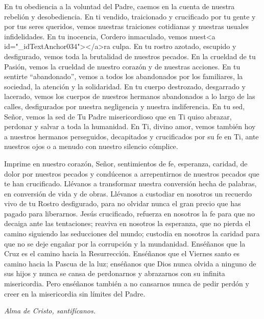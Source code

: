 			\begin{body}En tu obediencia a la voluntad del Padre, caemos en la cuenta de nuestra rebelión y desobediencia. En ti vendido, traicionado y crucificado por tu gente y por tus seres queridos, vemos nuestras traiciones cotidianas y nuestras usuales infidelidades. En tu inocencia, Cordero inmaculado, vemos nuest<a id="_idTextAnchor034"></a>ra culpa. En tu rostro azotado, escupido y desfigurado, vemos toda la brutalidad de nuestros pecados. En la crueldad de tu Pasión, vemos la crueldad de nuestro corazón y de nuestras acciones. En tu sentirte “abandonado”, vemos a todos los abandonados por los familiares, la sociedad, la atención y la solidaridad. En tu cuerpo destrozado, desgarrado y lacerado, vemos los cuerpos de nuestros hermanos abandonados a lo largo de las calles, desfigurados por nuestra negligencia y nuestra indiferencia. En tu sed, Señor, vemos la sed de Tu Padre misericordioso que en Ti quiso abrazar, perdonar y salvar a toda la humanidad. En Ti, divino amor, vemos también hoy a nuestros hermanos perseguidos, decapitados y crucificados por su fe en Ti, ante nuestros ojos o a menudo con nuestro silencio cómplice. \end{body}
			
			\begin{body}Imprime en nuestro corazón, Señor, sentimientos de fe, esperanza, caridad, de dolor por nuestros pecados y condúcenos a arrepentirnos de nuestros pecados que te han crucificado. Llévanos a transformar nuestra conversión hecha de palabras, en conversión de vida y de obras. Llévanos a custodiar en nosotros un recuerdo vivo de tu Rostro desfigurado, para no olvidar nunca el gran precio que has pagado para liberarnos. Jesús crucificado, refuerza en nosotros la fe para que no decaiga ante las tentaciones; reaviva en nosotros la esperanza, que no pierda el camino siguiendo las seducciones del mundo; custodia en nosotros la caridad para que no se deje engañar por la corrupción y la mundanidad. Enséñanos que la Cruz es el camino hacia la Resurrección. Enséñanos que el Viernes santo es camino hacia la Pascua de la luz; enséñanos que Dios nunca olvida a ninguno de sus hijos y nunca se cansa de perdonarnos y abrazarnos con su infinita misericordia. Pero enséñanos también a no cansarnos nunca de pedir perdón y creer en la misericordia sin límites del Padre. \end{body}
			
			\begin{bodyprose}\textit{Alma de Cristo, santifícanos.}\end{bodyprose}
			
